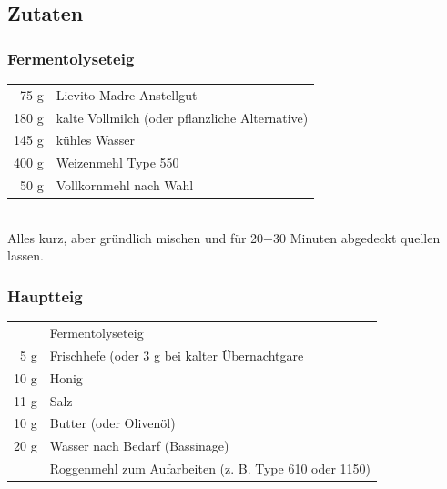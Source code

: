 \subsection*{Zutaten}
\subsubsection*{Fermentolyseteig}
\begin{tabular}{r l}
    75 g & Lievito-Madre-Anstellgut\\
    180 g & kalte Vollmilch (oder pflanzliche Alternative)\\
    145 g & kühles Wasser\\
    400 g & Weizenmehl Type 550\\
    50 g & Vollkornmehl nach Wahl\\
\end{tabular}\\
Alles kurz, aber gründlich mischen und für 20−30 Minuten abgedeckt quellen lassen.


\subsubsection*{Hauptteig}
\begin{tabular}{r l}
    & Fermentolyseteig                                      \\
    5 g & Frischhefe (oder 3 g bei kalter Übernachtgare         \\
    10 g & Honig  \\
    11 g & Salz                                                  \\
    10 g & Butter (oder Olivenöl)                                \\
    20 g & Wasser nach Bedarf (Bassinage)                        \\
    & Roggenmehl zum Aufarbeiten (z. B. Type 610 oder 1150)
\end{tabular}\\


